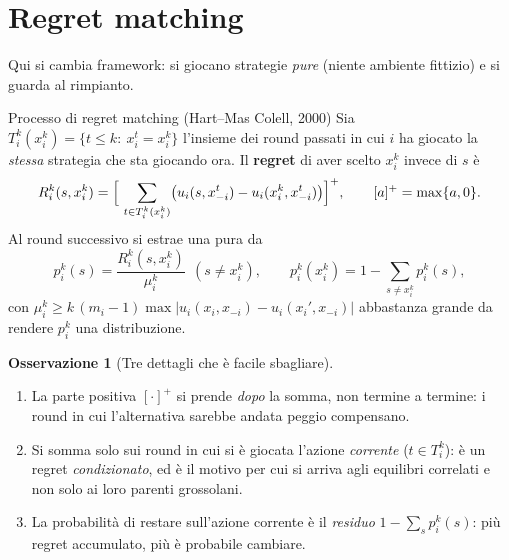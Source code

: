 \documentclass[12pt,a4paper,twoside]{book}
\theoremstyle{plain}
\theoremstyle{definition}
\newtheorem{remark}[theorem]{Osservazione}
\begin{document}
\section{Regret matching}

Qui si cambia framework: si giocano strategie \emph{pure} (niente ambiente
fittizio) e si guarda al rimpianto.

\begin{defbox}{Processo di regret matching (Hart--Mas Colell, 2000)}
Sia $T_i^k(x_i^k)=\{t\le k:\ x_i^t=x_i^k\}$ l'insieme dei round passati in cui $i$
ha giocato la \emph{stessa} strategia che sta giocando ora. Il \textbf{regret} di
aver scelto $x_i^k$ invece di $s$ è
\[
  R_i^k(s,x_i^k)=\Bigl[\ \sum_{t\in T_i^k(x_i^k)}
      \bigl(u_i(s,x^t_{-i})-u_i(x_i^k,x^t_{-i})\bigr)\Bigr]^{+},
  \qquad [a]^+=\max\{a,0\}.
\]
Al round successivo si estrae una pura da
\[
  p_i^k(s)=\frac{R_i^k(s,x_i^k)}{\mu_i^k}\ \ (s\ne x_i^k),
  \qquad
  p_i^k(x_i^k)=1-\sum_{s\ne x_i^k}p_i^k(s),
\]
con $\mu_i^k\ge k\,(m_i-1)\max|u_i(x_i,x_{-i})-u_i(x_i',x_{-i})|$ abbastanza grande
da rendere $p_i^k$ una distribuzione.
\end{defbox}

\begin{remark}[Tre dettagli che è facile sbagliare]
\begin{enumerate}[leftmargin=*]
  \item La parte positiva $[\cdot]^+$ si prende \emph{dopo} la somma, non termine a
        termine: i round in cui l'alternativa sarebbe andata peggio compensano.
  \item Si somma solo sui round in cui si è giocata l'azione \emph{corrente}
        ($t\in T_i^k$): è un regret \emph{condizionato}, ed è il motivo per cui si
        arriva agli equilibri correlati e non solo ai loro parenti grossolani.
  \item La probabilità di restare sull'azione corrente è il \emph{residuo}
        $1-\sum_s p_i^k(s)$: più regret accumulato, più è probabile cambiare.
\end{enumerate}
\end{remark}
\end{document}
